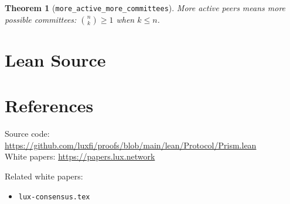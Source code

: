 \documentclass[11pt]{article}
\newtheorem{theorem}{Theorem}
\begin{document}
\begin{theorem}[\texttt{more\_active\_more\_committees}]
More active peers means more possible committees: $\binom{n}{k} \geq 1$ when $k \leq n$.
\end{theorem}


\section{Lean Source}


\section{References}
\noindent Source code: \url{https://github.com/luxfi/proofs/blob/main/lean/Protocol/Prism.lean}\\
\noindent White papers: \url{https://papers.lux.network}

\noindent Related white papers:
\begin{itemize}
  \item \texttt{lux-consensus.tex}
\end{itemize}
\end{document}
